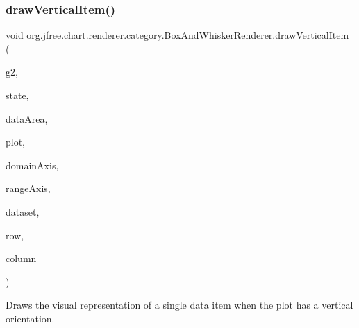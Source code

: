 \subsubsection{\texorpdfstring{draw\+Vertical\+Item()}{drawVerticalItem()}}
{\footnotesize\ttfamily void org.\+jfree.\+chart.\+renderer.\+category.\+Box\+And\+Whisker\+Renderer.\+draw\+Vertical\+Item (\begin{DoxyParamCaption}\item[{Graphics2D}]{g2,  }\item[{\mbox{\hyperlink{classorg_1_1jfree_1_1chart_1_1renderer_1_1category_1_1_category_item_renderer_state}{Category\+Item\+Renderer\+State}}}]{state,  }\item[{Rectangle2D}]{data\+Area,  }\item[{\mbox{\hyperlink{classorg_1_1jfree_1_1chart_1_1plot_1_1_category_plot}{Category\+Plot}}}]{plot,  }\item[{\mbox{\hyperlink{classorg_1_1jfree_1_1chart_1_1axis_1_1_category_axis}{Category\+Axis}}}]{domain\+Axis,  }\item[{\mbox{\hyperlink{classorg_1_1jfree_1_1chart_1_1axis_1_1_value_axis}{Value\+Axis}}}]{range\+Axis,  }\item[{\mbox{\hyperlink{interfaceorg_1_1jfree_1_1data_1_1category_1_1_category_dataset}{Category\+Dataset}}}]{dataset,  }\item[{int}]{row,  }\item[{int}]{column }\end{DoxyParamCaption})}

Draws the visual representation of a single data item when the plot has a vertical orientation.


